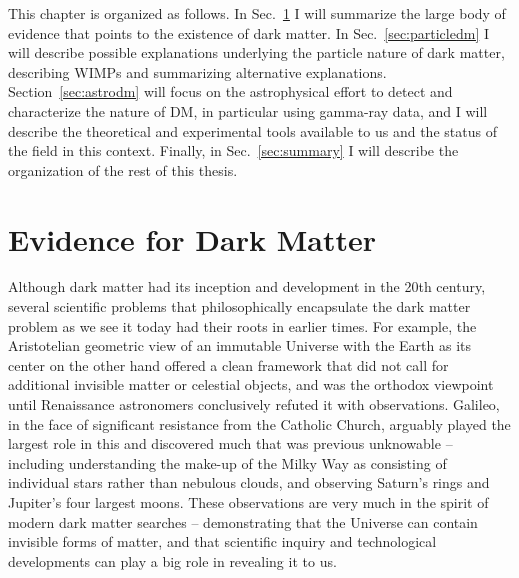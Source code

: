 This chapter is organized as follows. In Sec.~\ref{sec:evidence} I will summarize the large body of evidence that points to the existence of dark matter. In Sec.~\ref{sec:particledm} I will describe possible explanations underlying the particle nature of dark matter, describing WIMPs and summarizing alternative explanations. Section~\ref{sec:astrodm} will focus on the astrophysical effort to detect and characterize the nature of DM, in particular using gamma-ray data, and I will describe the theoretical and experimental tools available to us and the status of the field in this context. Finally, in Sec.~\ref{sec:summary} I will describe the organization of the rest of this thesis. %

\section{Evidence for Dark Matter}
\label{sec:evidence}

Although dark matter had its inception and development in the 20th century, several scientific problems that philosophically encapsulate the dark matter problem as we see it today had their roots in earlier times. For example, the Aristotelian geometric view of an immutable Universe with the Earth as its center on the other hand offered a clean framework that did not call for additional invisible matter or celestial objects, and was the orthodox viewpoint until Renaissance astronomers conclusively refuted it with observations. Galileo, in the face of significant resistance from the Catholic Church, arguably played the largest role in this and discovered much that was previous unknowable -- including understanding the make-up of the Milky Way as consisting of individual stars rather than nebulous clouds, and observing Saturn's rings and Jupiter's four largest moons. These observations are very much in the spirit of modern dark matter searches -- demonstrating that the Universe can contain invisible forms of matter, and that scientific inquiry and technological developments can play a big role in revealing it to us.


